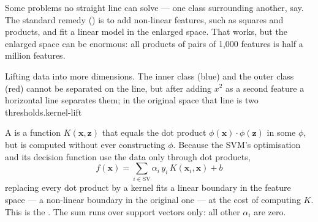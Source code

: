 Some problems no straight line can solve --- one class surrounding another, say.
The standard remedy () is to add non-linear features, such as
squares and products, and fit a linear model in the enlarged space. That works,
but the enlarged space can be enormous: all products of pairs of 1{,}000 features
is half a million features.

%
{Lifting data into more dimensions. The inner class (blue) and the outer class (red)
cannot be separated on the line, but after adding $x^2$ as a second feature a horizontal
line separates them; in the original space that line is two thresholds.}{kernel-lift}

\begin{definitionbox}[Kernel]
A  is a function $K(\mathbf{x}, \mathbf{z})$ that equals the dot product
$\phi(\mathbf{x})\cdot\phi(\mathbf{z})$ in some  $\phi$, but is
computed without ever constructing $\phi$. Because the SVM's optimisation and its
decision function use the data only through dot products,
\[
f(\mathbf{x}) = \sum_{i \in \text{SV}} \alpha_i\, y_i\, K(\mathbf{x}_i, \mathbf{x}) + b
\]
replacing every dot product by a kernel fits a linear boundary in the feature space
--- a non-linear boundary in the original one --- at the cost of computing $K$.
This is the . The sum runs over support vectors only: all other
$\alpha_i$ are zero.
\end{definitionbox}

